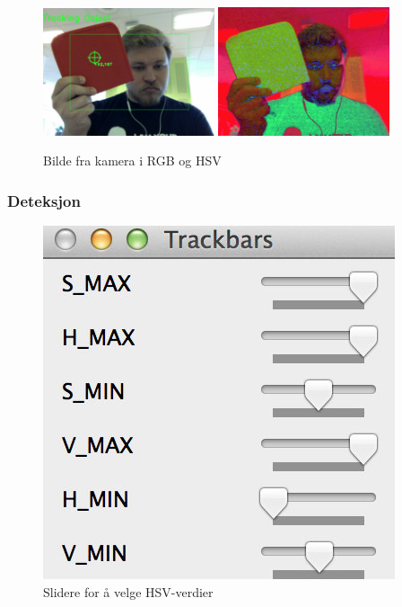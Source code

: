 \begin{figure}[!ht]
	\centering
	{\includegraphics[width=0.45\textwidth]{img/first-rgb.jpg}}
	{\includegraphics[width=0.45\textwidth]{img/first-hsv.jpg}}
	\caption{Bilde fra kamera i RGB og HSV}
\end{figure}

\subsubsection{Deteksjon}

\begin{figure}
	\includegraphics[width=\linewidth]{img/sliders.jpg}
	\caption{Slidere for å velge HSV-verdier}
	\label{fig:sliders}
\end{figure}

